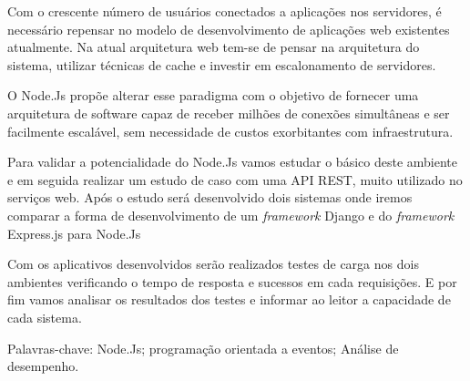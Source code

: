 \begin{resumo}
\vspace{-1cm}

\onehalfspacing

\noindent
  
  
  Com o crescente número de usuários conectados a aplicações nos servidores,
  é necessário repensar no modelo de desenvolvimento de aplicações web existentes atualmente.
  Na atual arquitetura web tem-se de pensar na arquitetura do sistema, utilizar técnicas de cache e 
  investir em escalonamento de servidores.  
  
  O Node.Js propõe alterar esse paradigma com o objetivo de fornecer uma arquitetura de software 
  capaz de receber milhões de conexões simultâneas e ser facilmente escalável, 
  sem necessidade de custos exorbitantes com infraestrutura.
  
  Para validar a potencialidade do Node.Js vamos estudar o básico deste ambiente e em seguida realizar um
  estudo de caso com uma API REST, muito utilizado no serviços web. Após o estudo será desenvolvido
  dois sistemas onde iremos comparar a forma de desenvolvimento de um \textit{framework} Django e 
  do \textit{framework} Express.js para Node.Js
  
  Com os aplicativos desenvolvidos serão realizados testes de carga nos dois ambientes verificando o tempo
  de resposta e sucessos em cada requisições. E por fim vamos analisar os resultados dos testes e informar
  ao leitor a capacidade de cada sistema.

\vspace*{.75cm}

\noindent Palavras-chave: Node.Js; programação orientada a eventos; Análise de desempenho.\\

\end{resumo}